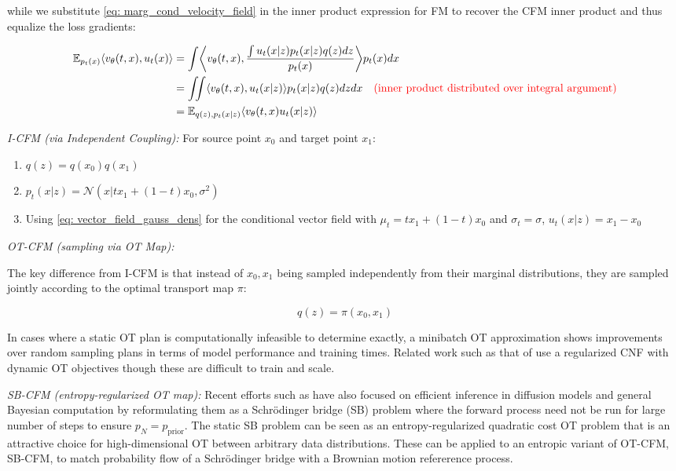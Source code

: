 \documentclass[12pt]{article}
\renewcommand{\[}{\left[}
\renewcommand{\]}{\right]}
\renewcommand{\(}{\left(}
\renewcommand{\)}{\right)}
\newcommand{\EE}{\mathbb{E}}
\newcommand{\CN}{\mathcal{N}}
\begin{document}
while we substitute \eqref{eq: marg_cond_velocity_field} in the inner product expression for FM to recover the CFM inner product and thus equalize the loss gradients:

\begin{align*}
    \EE_{p_t(x)}\langle v_\theta(t, x), u_t(x)\rangle &= \int \biggl<v_\theta(t, x), \frac{\int u_t(x|z)p_t(x|z)q(z)dz}{p_t(x)}\biggr>p_t(x)dx \\
    &=\iint \langle v_\theta(t, x), u_t(x|z)\rangle p_t(x|z)q(z)dzdx \quad \textcolor{red}{\text{(inner product distributed over integral argument)}}\\
    &=\EE_{q(z), p_t(x|z)}\langle v_\theta(t, x) u_t(x | z) \rangle
\end{align*}

\medskip
\emph{I-CFM (via Independent Coupling):}
For source point $x_0$ and target point $x_1$:

\begin{enumerate}
    \item $q(z) = q(x_0)q(x_1)$

    \item $p_t(x|z) = \CN(x | tx_1 + (1 - t)  x_0, \sigma^2)$

    \item Using \eqref{eq: vector_field_gauss_dens} for the conditional vector field with $\mu_t = tx_1 + (1 - t)x_0 $ and $\sigma_t = \sigma$, $u_t(x|z) = x_1 - x_0$
\end{enumerate}

\medskip
\emph{OT-CFM (sampling via OT Map):}

The key difference from I-CFM is that instead of $x_0, x_1$ being sampled independently from their marginal distributions, they are sampled jointly according to the optimal transport map $\pi$:

$$q(z) = \pi(x_0, x_1)$$

In cases where a static OT plan is computationally infeasible to determine exactly, a minibatch OT approximation \citep{fatras_learning_2020} shows improvements over random sampling plans in terms of model performance and training times. 
Related work such as that of \cite{finlay_how_2020} use a regularized CNF with dynamic OT objectives though these are difficult to train and scale.


\emph{SB-CFM (entropy-regularized OT map):}
Recent efforts such as \citep{de_bortoli_diffusion_2021,heng_diffusion_2024} have also focused on efficient inference in diffusion models and general Bayesian computation by reformulating them as a Schrödinger bridge (SB) problem where the forward process need not be run for large number of steps to ensure $p_N = p_{\text{prior}}$. 
The static SB problem can be seen as an entropy-regularized quadratic cost OT problem that is an attractive choice for high-dimensional OT between arbitrary data distributions. 
These can be applied to an entropic variant of OT-CFM, SB-CFM, to match probability flow of a Schrödinger bridge with a Brownian motion refererence process.
\end{document}
